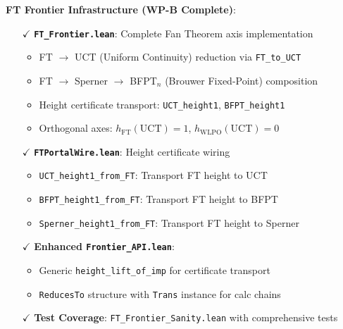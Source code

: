 \documentclass[11pt]{article}
\theoremstyle{definition}
\theoremstyle{remark}
\begin{document}
\textbf{FT Frontier Infrastructure (WP-B Complete)}:
\begin{itemize}
\item[$\checkmark$] \textbf{\texttt{FT\_Frontier.lean}}: Complete Fan Theorem axis implementation
  \begin{itemize}
  \item FT $\to$ UCT (Uniform Continuity) reduction via \texttt{FT\_to\_UCT}
  \item FT $\to$ Sperner $\to$ BFPT$_n$ (Brouwer Fixed-Point) composition
  \item Height certificate transport: \texttt{UCT\_height1}, \texttt{BFPT\_height1}
  \item Orthogonal axes: $h_{\text{FT}}(\text{UCT}) = 1$, $h_{\text{WLPO}}(\text{UCT}) = 0$
  \end{itemize}
\item[$\checkmark$] \textbf{\texttt{FTPortalWire.lean}}: Height certificate wiring
  \begin{itemize}
  \item \texttt{UCT\_height1\_from\_FT}: Transport FT height to UCT
  \item \texttt{BFPT\_height1\_from\_FT}: Transport FT height to BFPT
  \item \texttt{Sperner\_height1\_from\_FT}: Transport FT height to Sperner
  \end{itemize}
\item[$\checkmark$] \textbf{Enhanced \texttt{Frontier\_API.lean}}:
  \begin{itemize}
  \item Generic \texttt{height\_lift\_of\_imp} for certificate transport
  \item \texttt{ReducesTo} structure with \texttt{Trans} instance for calc chains
  \end{itemize}
\item[$\checkmark$] \textbf{Test Coverage}: \texttt{FT\_Frontier\_Sanity.lean} with comprehensive tests
\end{itemize}
\end{document}
